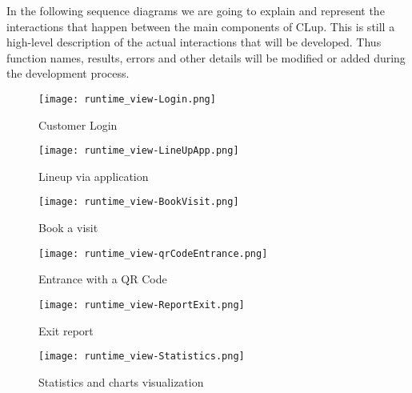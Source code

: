 In the following sequence diagrams we are going to explain and represent the interactions that happen between the main components of CLup. This is still a high-level description of the actual interactions that will be developed. Thus function names, results, errors and other details will be modified or added during the development process. 

\begin{figure}[H]
    \centering
    \texttt{[image: runtime\_view-Login.png]}
    \caption{Customer Login}
\end{figure}

\begin{figure}[H]
    \centering
    \texttt{[image: runtime\_view-LineUpApp.png]}
    \caption{Lineup via application}
\end{figure}

\begin{figure}[H]
    \centering
    \texttt{[image: runtime\_view-BookVisit.png]}
    \caption{Book a visit}
\end{figure}

\begin{figure}[H]
    \centering
    \texttt{[image: runtime\_view-qrCodeEntrance.png]}
    \caption{Entrance with a QR Code}
\end{figure}

\begin{figure}[H]
    \centering
    \texttt{[image: runtime\_view-ReportExit.png]}
    \caption{Exit report}
\end{figure}

\begin{figure}[H]
    \centering
    \texttt{[image: runtime\_view-Statistics.png]}
    \caption{Statistics and charts visualization}
\end{figure}